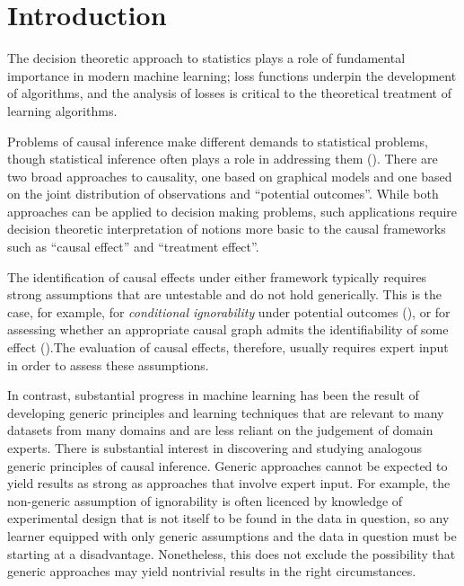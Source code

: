 \section{Introduction}

The decision theoretic approach to statistics plays a role of fundamental importance in modern machine learning; loss functions underpin the development of algorithms, and the analysis of losses is critical to the theoretical treatment of learning algorithms.

Problems of causal inference make different demands to statistical problems, though statistical inference often plays a role in addressing them (\cite{pearl_causality:_2009}). There are two broad approaches to causality, one based on graphical models and one based on the joint distribution of observations and ``potential outcomes''. While both approaches can be applied to decision making problems, such applications require decision theoretic interpretation of notions more basic to the causal frameworks such as ``causal effect'' and ``treatment effect''.

The identification of causal effects under either framework typically requires strong assumptions that are untestable and do not hold generically. This is the case, for example, for \emph{conditional ignorability} under potential outcomes (\cite{gordon_comparison_2018, heckman_randomization_1991}), or for assessing whether an appropriate causal graph admits the identifiability of some effect (\cite{tian2002general}).The evaluation of causal effects, therefore, usually requires expert input in order to assess these assumptions. 

In contrast, substantial progress in machine learning has been the result of developing generic principles and learning techniques that are relevant to many datasets from many domains and are less reliant on the judgement of domain experts. There is substantial interest in discovering and studying analogous generic principles of causal inference. Generic approaches cannot be expected to yield results as strong as approaches that involve expert input. For example, the non-generic assumption of ignorability is often licenced by knowledge of experimental design that is not itself to be found in the data in question, so any learner equipped with only generic assumptions and the data in question must be starting at a disadvantage. Nonetheless, this does not exclude the possibility that generic approaches may yield nontrivial results in the right circumstances.

